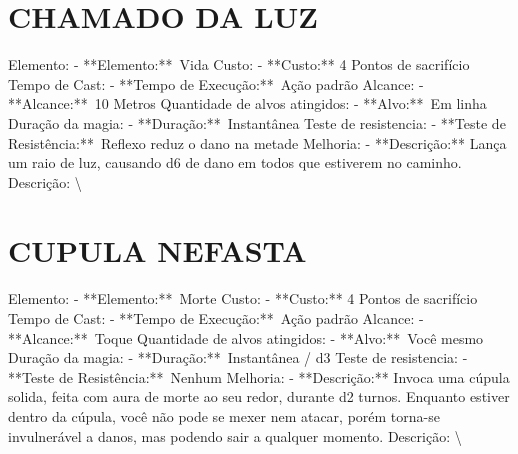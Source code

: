 \documentclass{article}%
\begin{document}
\section{CHAMADO DA LUZ}%
\label{sec:CHAMADODALUZ}%
Elemento: {-} **Elemento:**~Vida\newline%
Custo: {-} **Custo:** 4 Pontos de sacrifício\newline%
Tempo de Cast: {-} **Tempo de Execução:**~Ação padrão\newline%
Alcance: {-} **Alcance:**~10 Metros\newline%
Quantidade de alvos atingidos: {-} **Alvo:**~Em linha\newline%
Duração da magia: {-} **Duração:**~Instantânea\newline%
Teste de resistencia: {-} **Teste de Resistência:**~Reflexo reduz o dano na metade\newline%
Melhoria: {-} **Descrição:** Lança um raio de luz, causando d6 de dano em todos que estiverem no caminho.\newline%
Descrição: \textbackslash{}

%
\section{CUPULA NEFASTA}%
\label{sec:CUPULANEFASTA}%
Elemento: {-} **Elemento:**~Morte\newline%
Custo: {-} **Custo:** 4 Pontos de sacrifício\newline%
Tempo de Cast: {-} **Tempo de Execução:**~Ação padrão\newline%
Alcance: {-} **Alcance:**~Toque\newline%
Quantidade de alvos atingidos: {-} **Alvo:**~Você mesmo\newline%
Duração da magia: {-} **Duração:**~Instantânea / d3\newline%
Teste de resistencia: {-} **Teste de Resistência:**~Nenhum\newline%
Melhoria: {-} **Descrição:** Invoca uma cúpula solida, feita com aura de morte ao seu redor, durante d2 turnos. Enquanto estiver dentro da cúpula, você não pode se mexer nem atacar, porém torna{-}se invulnerável a danos, mas podendo sair a qualquer momento.\newline%
Descrição: \textbackslash{}

%
\end{document}
